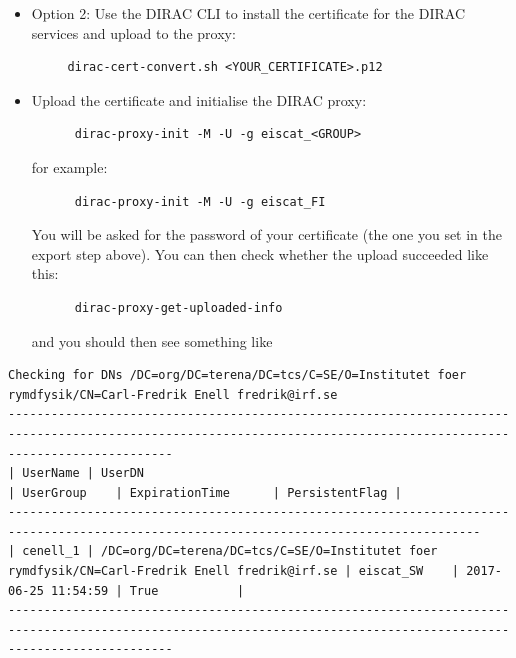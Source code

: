\documentclass[a4paper]{article}
\begin{document}
\begin{enumerate}
\begin{itemize}
  \item Option 2: Use the DIRAC CLI to install the certificate for the DIRAC services and upload to the proxy: 

\begin{verbatim}
     dirac-cert-convert.sh <YOUR_CERTIFICATE>.p12
     \end{verbatim}

  \item Upload the certificate and initialise the DIRAC proxy:

\begin{verbatim}
      dirac-proxy-init -M -U -g eiscat_<GROUP>
\end{verbatim}

    for example:
\begin{verbatim}
      dirac-proxy-init -M -U -g eiscat_FI
\end{verbatim}
    
    
    You will be asked for the password of your certificate (the one you set in the export step above).
    You can then check whether the upload succeeded like this:
    \begin{verbatim}
      dirac-proxy-get-uploaded-info 
    \end{verbatim}

    and you should then see something like
  \end{itemize}


\noindent
{\tiny
\begin{verbatim}
Checking for DNs /DC=org/DC=terena/DC=tcs/C=SE/O=Institutet foer rymdfysik/CN=Carl-Fredrik Enell fredrik@irf.se
-------------------------------------------------------------------------------------------------------------------------------------------------------------------
| UserName | UserDN                                                                                         | UserGroup    | ExpirationTime      | PersistentFlag |
----------------------------------------------------------------------------------------------------------------------------------------
| cenell_1 | /DC=org/DC=terena/DC=tcs/C=SE/O=Institutet foer rymdfysik/CN=Carl-Fredrik Enell fredrik@irf.se | eiscat_SW    | 2017-06-25 11:54:59 | True           |
-------------------------------------------------------------------------------------------------------------------------------------------------------------------
\end{verbatim}
}%

\end{enumerate}
\end{document}
